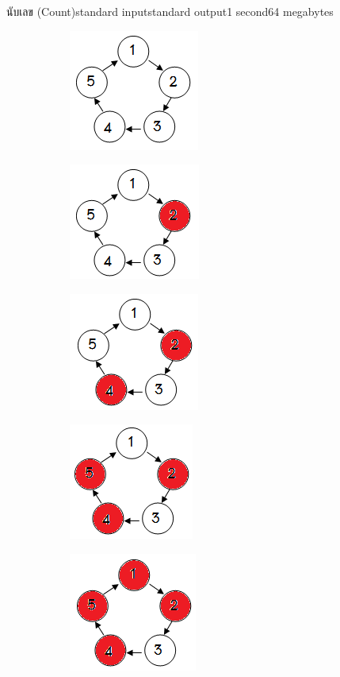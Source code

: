 \documentclass[11pt,a4paper]{article}
\begin{document}
\begin{problem}{นับเลข (Count)}{standard input}{standard output}{1 second}{64 megabytes}
\begin{figure}[h]
\centering
\begin{subfigure}{18ex}
\centering
\includegraphics[width=15ex]{../latex/img/1106/1106-1.png}
\end{subfigure}%
\begin{subfigure}{18ex}
\centering
\includegraphics[width=15ex]{../latex/img/1106/1106-2.png}
\end{subfigure}%
\begin{subfigure}{18ex}
\centering
\includegraphics[width=15ex]{../latex/img/1106/1106-3.png}
\end{subfigure}%
\begin{subfigure}{18ex}
\centering
\includegraphics[width=15ex]{../latex/img/1106/1106-4.png}
\end{subfigure}%
\begin{subfigure}{18ex}
\centering
\includegraphics[width=15ex]{../latex/img/1106/1106-5.png}
\end{subfigure}%
\end{figure}


\end{problem}
\end{document}
